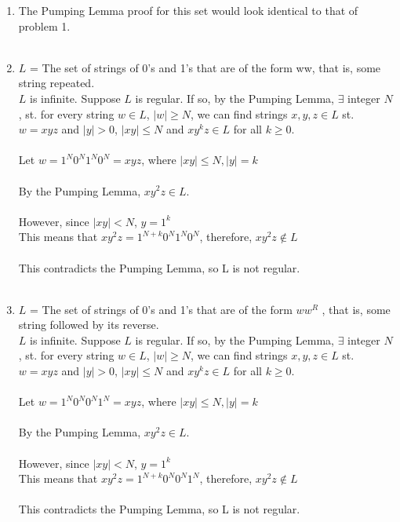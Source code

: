 \documentclass[a4paper]{article}
\begin{document}
\begin{enumerate}
\item The Pumping Lemma proof for this set would look identical to that of problem 1.
\\
\\


\item $L$ = The set of strings of 0's and 1's that are of the form ww, that is, some string repeated. \\
$L$ is infinite. Suppose $L$ is regular. If so, by the Pumping Lemma, $\exists$ integer $N$, st. for every string $w \in L$, $|w| \ge N$, we can find strings $x, y, z \in L$ st. $w=xyz$ and $|y|>0$, $|xy| \le N$ and $xy^k z \in L$ for all $k \ge 0$. \\
\\
Let $w = 1^N0^N1^N0^N = xyz$, where $|xy| \le N, |y| = k$ \\
\\
By the Pumping Lemma, $xy^2 z \in L$. \\
\\
However, since $|xy| < N$, $y = 1^k$ \\
This means that $xy^2z = 1^{N+k}0^N1^N0^N$, therefore, $xy^2z \notin L$\\
\\
This contradicts the Pumping Lemma, so L is not regular. 
\\
\\


\item $L$ = The set of strings of 0's and 1's that are of the form $ww^R$ , that is, some string followed by its reverse. \\
$L$ is infinite. Suppose $L$ is regular. If so, by the Pumping Lemma, $\exists$ integer $N$, st. for every string $w \in L$, $|w| \ge N$, we can find strings $x, y, z \in L$ st. $w=xyz$ and $|y|>0$, $|xy| \le N$ and $xy^k z \in L$ for all $k \ge 0$. \\
\\
Let $w = 1^N0^N0^N1^N = xyz$, where $|xy| \le N, |y| = k$ \\
\\
By the Pumping Lemma, $xy^2 z \in L$. \\
\\
However, since $|xy| < N$, $y = 1^k$ \\
This means that $xy^2z = 1^{N+k}0^N0^N1^N$, therefore, $xy^2z \notin L$\\
\\
This contradicts the Pumping Lemma, so L is not regular. 
\\
\\


\end{enumerate}
\end{document}
